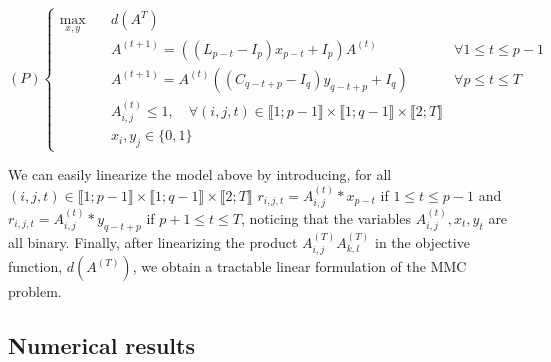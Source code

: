 \begin{equation*}
(P)\left\{
\begin{array}{lll}
\max\limits_{x,y}  \quad	& d(A^T)  \\
& A^{(t+1)}= ((L_{p-t}-I_p)x_{p-t}+I_p)A^{(t)} \qquad & \forall 1\le t\le p-1\\
& A^{(t+1)}= A^{(t)}((C_{q-t+p}-I_q)y_{q-t+p}+I_q) \qquad & \forall p\leq t\le T\\
& A^{(t)}_{i,j} \le 1, \quad \forall (i,j,t) \in \llbracket 1; p-1 \rrbracket \times \llbracket 1; q-1 \rrbracket \times \llbracket 2; T \rrbracket \\
& x_i,y_j \in \{0,1\}
\end{array}\right.
\end{equation*}

\noindent We can easily linearize the model above by introducing, for all $(i,j,t) \in \llbracket 1; p-1 \rrbracket \times \llbracket 1; q-1 \rrbracket \times \llbracket 2; T \rrbracket $ $r_{i,j,t}=A^{(t)}_{i,j}*x_{p-t}$ if $1\le t\le p-1$ and $r_{i,j,t}=A^{(t)}_{i,j}*y_{q-t+p}$ if $p+1\le t\le T$, noticing that the variables $A^{(t)}_{i,j},x_t,y_t$ are all binary. Finally, after linearizing the product $A^{(T)}_{i,j}A^{(T)}_{k,l}$ in the objective function, $d(A^{(T)})$, we obtain a tractable linear formulation of the MMC problem.



\subsection{Numerical results}

